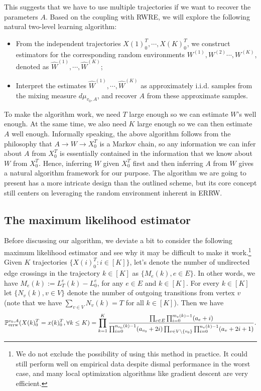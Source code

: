 \documentclass[a4paper, 11pt]{article}
\renewcommand{\P}{\mathbb{P}}
\newcommand{\Perrw}{\P_{\textnormal{errw}}}
\begin{document}
This suggests that we have to use multiple trajectories if we want to recover the parameters $A$. 
Based on the coupling with RWRE, we will explore the following natural two-level learning algorithm:
\begin{itemize}
    \item From the independent trajectories $X(1)_0^T, \cdots, X(K)_0^T$, we construct estimators for the corresponding random environments $W^{(1)}, W^{(2)}\cdots, W^{(K)}$, denoted as $\hat{W}^{(1)}, \cdots, \hat{W}^{(K)}$;
    \item Interpret the estimates $\hat{W}^{(1)}, \cdots, \hat{W}^{(K)}$ as approximately i.i.d. samples from the mixing measure $d\mu_{v_0,A}$, and recover $A$ from these approximate samples.
\end{itemize}

To make the algorithm work, we need $T$ large enough so we can estimate $W$'s well enough. At the same time, we also need $K$ large enough so we can then estimate $A$ well enough. Informally speaking, the above algorithm follows from the philosophy that $A\rightarrow W\rightarrow X_0^T$ is a Markov chain, so any information we can infer about $A$ from $X_0^T$ is essentially contained in the information that we know about $W$ from $X_0^T$. Hence, inferring $W$ given $X_0^T$ first and then inferring $A$ from $W$ gives a natural algorithm framework for our purpose. The algorithm we are going to present has a more intricate design than the outlined scheme, but its core concept still centers on leveraging the random environment inherent in ERRW.

\subsection{The maximum likelihood estimator}

Before discussing our algorithm, we deviate a bit to consider the following maximum likelihood estimator and see why it may be difficult to make it work.\footnote{We do not exclude the possibility of using this method in practice. It could still perform well on empirical data despite dismal performance in the worst case, and many local optimization algorithms like gradient descent are very efficient.} Given $K$ trajectories $\{X(i)_0^T: i\in [K]\}$, let's denote the number of undirected edge crossings in 
the trajectory $k \in [K]$ as $\{M_e(k), e\in E\}$. In other words, we have $M_e(k):=L_T^e(k)-L_0^e$, for any $e\in E$ and $k\in[K]$. For every
$k \in [K]$ let $\{N_v(k), v \in V\}$
denote the number of outgoing transitions from
vertex $v$ (note that we have 
$\sum_{v \in V} N_v(k) = T$ for all $k \in [K]$).
Then we have
\begin{equation*}
\Perrw^{v_0,A}(X(k)_0^T=x(k)_0^T, \forall k\leq K)=\prod_{k=1}^K \frac{\prod_{e\in E}\prod_{i=0}^{m_e(k)-1}(a_e+i)}{\prod_{i=0}^{n_{v_0}(k)-1}(a_{v_0}+2i) \prod_{v\in V\backslash\{v_0\}}\prod_{i=0}^{n_v(k)-1}(a_v+2i+1)}.
\end{equation*}
\end{document}
